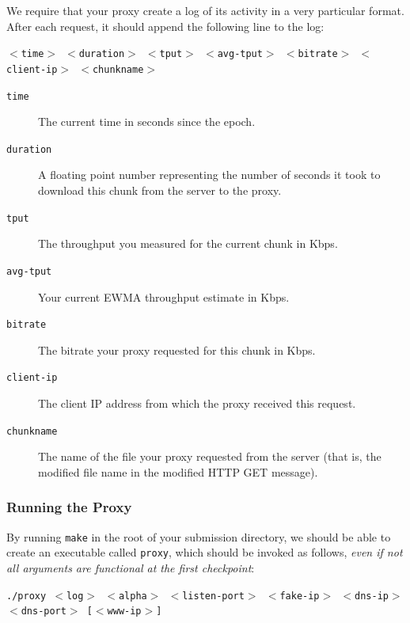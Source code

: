 \documentclass{article}
\begin{document}
We require that your proxy create a log of its activity in a very particular
format. After each request, it should append the following line to the log:
\begin{center}
	\texttt{$<$time$>$ $<$duration$>$ $<$tput$>$ $<$avg-tput$>$ $<$bitrate$>$ $<$client-ip$>$ $<$chunkname$>$}
\end{center}

\begin{description}
	\item[\texttt{time}] The current time in seconds since the epoch.
	\item[\texttt{duration}] A floating point number representing the number of
	seconds it took to download this chunk from the server to the proxy.
	\item[\texttt{tput}] The throughput you measured for the current chunk in
	Kbps.
	\item[\texttt{avg-tput}] Your current EWMA throughput estimate in Kbps.
	\item[\texttt{bitrate}] The bitrate your proxy requested for this chunk in
	Kbps.
	\item[\texttt{client-ip}] The client IP address from which the proxy
	received this request.
	\item[\texttt{chunkname}] The name of the file your proxy requested from
	the server (that is, the modified file name in the modified HTTP GET
	message).
\end{description}


\subsubsection{Running the Proxy}
\label{sec:running-proxy}

By running \texttt{make} in the root of your submission directory, we should be
able to create an executable called \texttt{proxy}, which should be invoked as
follows, \emph{even if not all arguments are functional at the first checkpoint}:
\begin{center}
	\texttt{./proxy $<$log$>$ $<$alpha$>$ $<$listen-port$>$ $<$fake-ip$>$ $<$dns-ip$>$ $<$dns-port$>$ [$<$www-ip$>$]}
\end{center}
\end{document}
